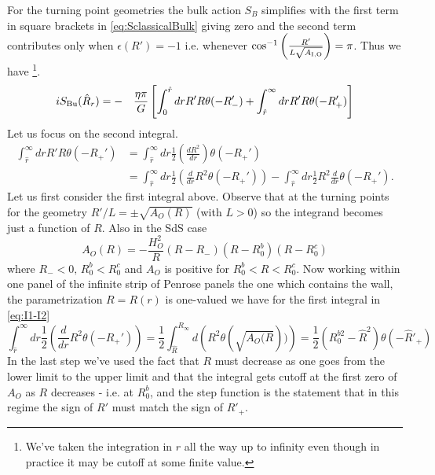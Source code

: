 \documentclass[a4paper,11pt]{article}
\numberwithin{equation}{section}
\numberwithin{equation}{section}
\begin{document}
For the turning point geometries the bulk action $S_{B}$ simplifies
with the first term in square brackets in  \eqref{eq:SclassicalBulk} giving zero and the second term
contributes only when $\epsilon(R')=-1$ i.e. whenever $\cos^{-1}\left(\frac{R'}{L\sqrt{A_{{\rm I,{\rm O}}}}}\right)=\pi$.
Thus we have \footnote{We've taken the integration in $r$ all the way up to infinity even though in practice it may be cutoff at some finite value. }.
\begin{eqnarray}
iS_{{\rm Bu}}(\hat{R}_{r}) & =- & \frac{\eta\pi}{G}\left[\int_{0}^{\hat{r}}drR'R\theta(-R_{-}')+\int_{\hat{r}}^{\infty}drR'R\theta(-R_{+}')\right]\label{eq:SButp}
\end{eqnarray}
Let us focus on the second integral.
\begin{align}
\int_{\hat{r}}^{\infty}drR'R\theta(-R_{+}') & =\int_{\hat{r}}^{\infty}dr\frac{1}{2}\left(\frac{dR^{2}}{dr}\right)\theta(-R_{+}')\nonumber \\
 & =\int_{\hat{r}}^{\infty}dr\frac{1}{2}\left(\frac{d}{dr}R^{2}\theta(-R_{+}')\right)-\int_{\hat{r}}^{\infty}dr\frac{1}{2}R^{2}\frac{d}{dr}\theta(-R_{+}').\label{eq:I1-I2}
\end{align}
Let us first consider the first integral above. Observe that at the
turning points for the geometry $R'/L=\pm\sqrt{A_{O}(R)}$ (with $L>0$)
so the integrand becomes just a function of $R$. Also in the SdS
case 
\begin{equation}
A_{O}(R)=-\frac{H_{O}^{2}}{R}\left(R-R_{-}\right)\left(R-R_0^{b}\right)\left(R-R_0^{c}\right)\label{eq:AO}
\end{equation}
where $R_{-}<0,\,R_0^{b}<R_0^{c}$ and $A_{O}$ is positive for
$R_0^{b}<R<R_0^{c}$. Now working within one panel of the infinite
strip of Penrose panels the one which contains the wall, the parametrization
$R=R(r)$ is one-valued we have for the first integral in \eqref{eq:I1-I2}
\[
\int_{\hat{r}}^{\infty}dr\frac{1}{2}\left(\frac{d}{dr}R^{2}\theta(-R_{+}')\right)=\frac{1}{2}\int_{\hat{R}}^{R_{\infty}}d\left(R^{2}\theta(\sqrt{A_{O}(R}))\right)=\frac{1}{2}\left(R_0^{b2}-\hat{R}^{2}\right)\theta\left(-\hat{R}'_{+}\right)
\]
In the last step we've used the fact that $R$ must decrease as one
goes from the lower limit to the upper limit and that the integral
gets cutoff at the first zero of $A_{O}$ as $R$ decreases - i.e.
at $R_0^{b}$, and the step function is the statement that in this
regime the sign of $R'$ must match the sign of $\hat{R}'_{+}$.
\end{document}
